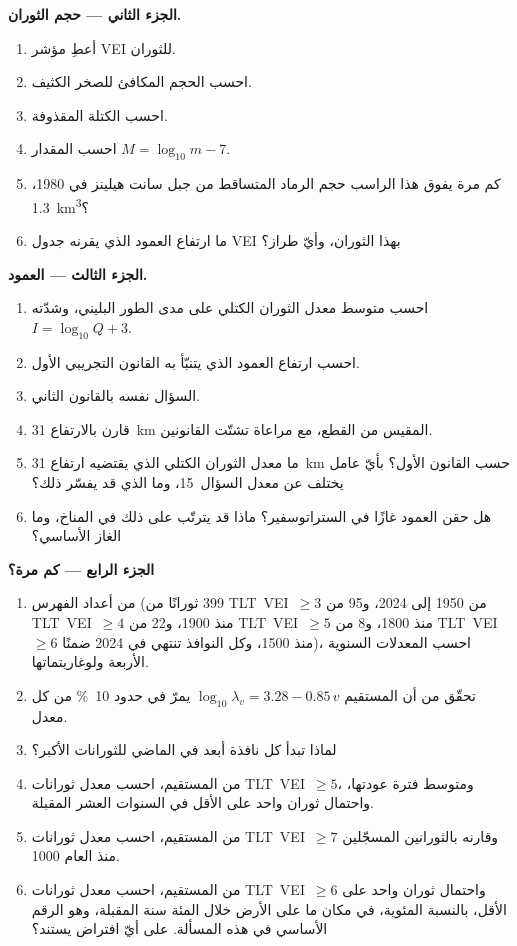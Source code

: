 \begin{problem}
\noindent\textbf{الجزء الثاني --- حجم الثوران.}
\begin{enumerate}[resume]
\item أعطِ مؤشر VEI للثوران.
\item احسب الحجم المكافئ للصخر الكثيف.
\item احسب الكتلة المقذوفة.
\item احسب المقدار $M = \log_{10}m - 7$.
\item كم مرة يفوق هذا الراسب حجم الرماد المتساقط من جبل سانت هيلينز في 1980،
\qty{1.3}{km^3}؟
\item ما ارتفاع العمود الذي يقرنه جدول VEI بهذا الثوران،
وأيّ طراز؟
\end{enumerate}

\noindent\textbf{الجزء الثالث --- العمود.}
\begin{enumerate}[resume]
\item احسب متوسط معدل الثوران الكتلي على مدى الطور البليني،
وشدّته $I = \log_{10}Q + 3$.
\item احسب ارتفاع العمود الذي يتنبّأ به القانون التجريبي الأول.
\item السؤال نفسه بالقانون الثاني.
\item قارن بالارتفاع \qty{31}{km} المقيس من القطع، مع مراعاة تشتّت
القانونين.
\item ما معدل الثوران الكتلي الذي يقتضيه ارتفاع \qty{31}{km} حسب القانون الأول؟ بأيّ
عامل يختلف عن معدل السؤال~15، وما الذي قد يفسّر ذلك؟
\item هل حقن العمود غازًا في الستراتوسفير؟ ماذا قد يترتّب على ذلك في
المناخ، وما الغاز الأساسي؟
\end{enumerate}

\noindent\textbf{الجزء الرابع --- كم مرة؟}
\begin{enumerate}[resume]
\item من أعداد الفهرس (399 ثورانًا من \mbox{\textdir TLT VEI $\ge 3$} من 1950 إلى
2024، و95 من \mbox{\textdir TLT VEI $\ge 4$} منذ 1900، و22 من \mbox{\textdir TLT VEI $\ge 5$} منذ 1800، و8 من \mbox{\textdir TLT VEI $\ge 6$} منذ
1500، وكل النوافذ تنتهي في 2024 ضمنًا)، احسب المعدلات السنوية الأربعة
ولوغاريتماتها.
\item تحقّق من أن المستقيم $\log_{10}\lambda_v = 3.28 - 0.85\,v$ يمرّ في حدود
\qty{10}{\percent} من كل معدل.
\item لماذا تبدأ كل نافذة أبعد في الماضي للثورانات الأكبر؟
\item من المستقيم، احسب معدل ثورانات \mbox{\textdir TLT VEI $\ge 5$}، ومتوسط
فترة عودتها، واحتمال ثوران واحد على الأقل في السنوات العشر المقبلة.
\item من المستقيم، احسب معدل ثورانات \mbox{\textdir TLT VEI $\ge 7$} وقارنه
بالثورانين المسجّلين منذ العام 1000.
\item من المستقيم، احسب معدل ثورانات \mbox{\textdir TLT VEI $\ge 6$}
واحتمال ثوران واحد على الأقل، بالنسبة المئوية، في مكان ما على الأرض خلال المئة سنة
المقبلة، وهو الرقم الأساسي في هذه المسألة. على أيّ افتراض يستند؟
\end{enumerate}
\end{problem}
